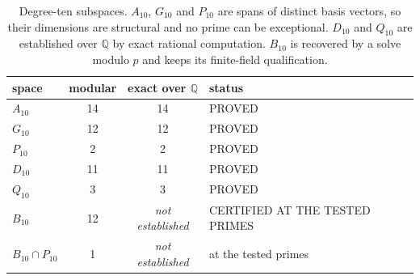 \begin{table}[t]
\centering
\small
\begin{tabular}{lccl}
\hline
space & modular & exact over $\mathbb{Q}$ & status \\
\hline
$A_{10}$ & 14 & 14 & PROVED \\
$G_{10}$ & 12 & 12 & PROVED \\
$P_{10}$ & 2 & 2 & PROVED \\
$D_{10}$ & 11 & 11 & PROVED \\
$Q_{10}$ & 3 & 3 & PROVED \\
$B_{10}$ & 12 & \textit{not established} & CERTIFIED AT THE TESTED PRIMES \\
$B_{10} \cap P_{10}$ & 1 & \textit{not established} & at the tested primes \\
\hline
\end{tabular}
\caption{Degree-ten subspaces. $A_{10}$, $G_{10}$ and $P_{10}$ are spans of distinct basis vectors, so their dimensions are structural and no prime can be exceptional. $D_{10}$ and $Q_{10}$ are established over $\mathbb{Q}$ by exact rational computation. $B_{10}$ is recovered by a solve modulo $p$ and keeps its finite-field qualification.}
\label{tab:spaces}
\end{table}
